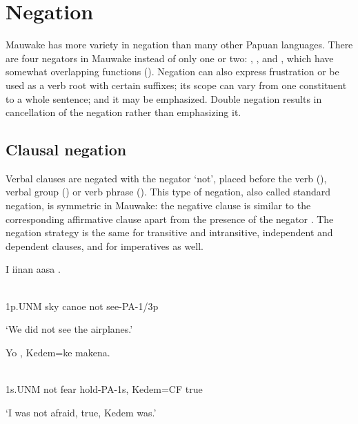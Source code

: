 \section{Negation}\footnotemark{}
\hypertarget{RefHeading22381935131865}{}
Mauwake has more variety in negation than many other Papuan languages. There are four negators in Mauwake instead of only one or two: , ,  and , which have somewhat overlapping functions (). Negation can also express frustration or be used as a verb root with certain suffixes; its scope can vary from one constituent to a whole sentence; and it may be emphasized. Double negation results in cancellation of the negation rather than emphasizing it. 

\subsection{Clausal negation}
\hypertarget{RefHeading22401935131865}{}
Verbal clauses are negated with the negator  `not', placed before the verb (), verbal group () or verb phrase (). This type of negation, also called standard negation, is symmetric in Mauwake: the negative clause is similar to the corresponding affirmative clause apart from the presence of the negator \citep[61-67]{Miestamo2005}. The negation strategy is the same for transitive and intransitive, independent and dependent clauses, and for imperatives as well. 

\ea%
\label{ex:x1090}
\gll I  iinan  aasa  . \\
      \\
\glt
\z

1p.UNM  sky  canoe  not  see-PA-1/3p

`We did not see the airplanes.'

\ea%
\label{ex:x1091}
\gll Yo  ,  Kedem=ke  makena. \\
      \\
\glt
\z

1s.UNM  not  fear  hold-PA-1s,  Kedem=CF  true

`I was not afraid, true, Kedem was.'

